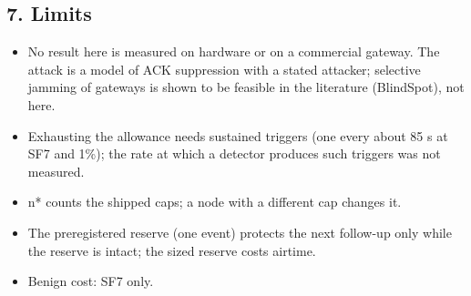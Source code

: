 \subsection*{7. Limits}

\begin{itemize}
\item No result here is measured on hardware or on a commercial gateway. The attack is a model of ACK suppression with a stated attacker; selective jamming of gateways is shown to be feasible in the literature (BlindSpot), not here.
\item Exhausting the allowance needs sustained triggers (one every about 85 s at SF7 and 1\%); the rate at which a detector produces such triggers was not measured.
\item n* counts the shipped caps; a node with a different cap changes it.
\item The preregistered reserve (one event) protects the next follow-up only while the reserve is intact; the sized reserve costs airtime.
\item Benign cost: SF7 only.
\end{itemize}


